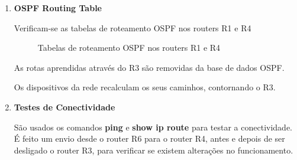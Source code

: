 \documentclass[11pt,english, openright, oneside]{book}
\begin{document}
\begin{enumerate}
\begin{enumerate}
\begin{enumerate}
              \pagebreak
              \item \textbf{OSPF Routing Table} \par \vspace{0.2cm}
                Verificam-se as tabelas de roteamento OSPF nos routers R1 e R4
                \vspace{0.4cm}
                \begin{figure}[h]
                  \centering
                  \qquad
                  \caption{Tabelas de roteamento OSPF nos routers R1 e R4}%
                  \label{fig:example}
                \end{figure} \par \vspace{0.4cm}

                As rotas aprendidas através do R3 são removidas da base de dados OSPF. \par
                Os dispositivos da rede recalculam os seus caminhos, contornando o R3.
              
              \pagebreak
              \item \textbf{Testes de Conectividade} \par \vspace{0.2cm}
                São usados os comandos \textbf{ping} e \textbf{show ip route} para testar a conectividade. É feito um envio desde o router R6 para o router R4, antes e depois de ser desligado o router R3, para verificar se existem alterações no funcionamento. \par \vspace{0.4cm}
                

\end{enumerate}
\end{enumerate}
\end{enumerate}
\end{document}
